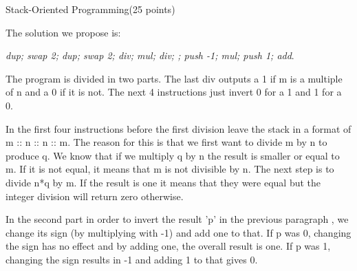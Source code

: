 \documentclass{article}
\begin{document}
\begin{question}{Stack-Oriented Programming}{(25 points)}
\begin{subquestion}
    The solution we propose is:
    
    \emph{dup; swap 2; dup; swap 2; div; mul; div; ; push -1; mul; push 1; add}.
    
    The program is divided in two parts. The last div outputs a 1 if m is a multiple of n and a 0 if it is not. The next 4 instructions just invert 0 for a 1 and 1 for a 0.
    
    In the first four instructions before the first division leave the stack in a format of m :: n :: n :: m. The reason for this is that we first want to divide m by n to produce q. We know that if we multiply q by n the result is smaller or equal to m. If it is not equal, it means that m is not divisible by n. The next step is to divide n*q by m. If the result is one it means that they were equal but the integer division will return zero otherwise.
    
    In the second part in order to invert the result 'p' in the previous paragraph , we change its sign (by multiplying with -1) and add one to that. If p was 0, changing the sign has no effect and by adding one, the overall result is one. If p was 1, changing the sign results in -1 and adding 1 to that gives 0.
    
    
  \end{subquestion}
  
    
\end{question}
\end{document}
